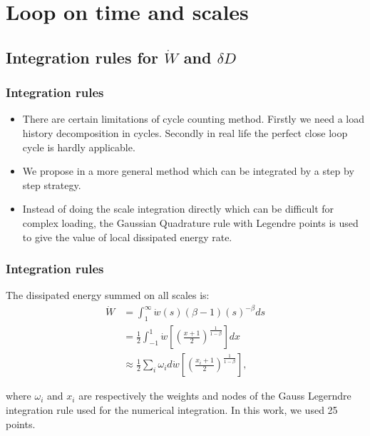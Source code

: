 \documentclass[xcolor=table]{Bredelebeamer}
\begin{document}
\section{Loop on time and scales}
\subsection{Integration rules for $\dot{W}$ and $\delta D$}

\begin{frame}
\frametitle{Integration rules}
	\begin{block}{}	
\begin{itemize}
\item There are certain limitations of cycle counting method. Firstly we need a load history decomposition in cycles. Secondly in real life the perfect close loop cycle is hardly applicable.
					
\vspace{6pt}
\item We propose in a more general method which can be integrated by a step by step strategy. 
					
\vspace{6pt}
\item Instead of doing the scale integration directly which can be difficult for complex loading, the Gaussian Quadrature rule with Legendre points is used to give the value of local dissipated energy rate.
\end{itemize}	
\end{block}
\end{frame}	

\begin{frame}
	\frametitle{Integration rules}
The dissipated energy summed on all scales is:
\begin{equation}
	\begin{split}
		\dot{W}&=\int_{1}^{\infty}\dot{w}(s) (\beta-1)(s)^{-\beta}ds
			\\&=\frac{1}{2}\int_{-1}^{1}\dot{w}\left[  \left( \frac{x+1}{2}\right) ^{\frac{1}{1-\beta}}\right] dx
			\\&\approx\frac{1}{2}\sum_{i}\omega_id\dot{w}\left[  \left( \frac{x_i+1}{2}\right) ^{\frac{1}{1-\beta}}\right],
	\end{split}
	\label{allscale}
\end{equation}

\vspace{6pt}
where $\omega_i$ and $x_i$ are respectively the weights and nodes of the Gauss Legerndre integration rule used for the numerical integration. In this work, we used 25 points.
\end{frame}
\end{document}
